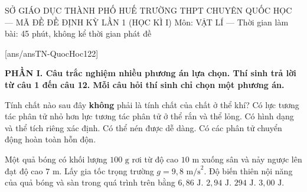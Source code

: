 

\def\toanlop{12}
\def\thoigian{45}
\def\namhoc{2024 - 2025}
\begin{dethi}
	{SỞ GIÁO DỤC THÀNH PHỐ HUẾ}
	{TRƯỜNG THPT CHUYÊN QUỐC HỌC --- MÃ ĐỀ \thedeso}
	{ĐỀ ĐỊNH KỲ LẦN 1 (HỌC KÌ I)}
	{Môn: VẬT LÍ --- Thời gian làm bài: 45 phút, không kể thời gian phát đề}
\end{dethi}

[ans/ansTN-QuocHoc122]

\noindent \textbf{PHẦN I. Câu trắc nghiệm nhiều phương án lựa chọn. Thí sinh trả lời từ câu 1 đến câu 12. Mỗi câu hỏi thí sinh chỉ chọn một phương án.}
\vspace{0.2cm}

\begin{ex}%
	Tính chất nào sau đây \textbf{không} phải là tính chất của chất ở thể khí?
	\choice
	{Có lực tương tác phân tử nhỏ hơn lực tương tác phân tử ở thể rắn và thể lỏng.}
	{\True Có hình dạng và thể tích riêng xác định.}
	{Có thể nén được dễ dàng.}
	{Có các phân tử chuyển động hoàn toàn hỗn độn.}
\end{ex}

\begin{ex}%
	Một quả bóng có khối lượng $100\text{ g}$ rơi từ độ cao $10\text{ m}$ xuống sân và nảy ngược lên đạt độ cao $7\text{ m}$. Lấy gia tốc trọng trường $g=9,8\text{ m/s}^2$. Độ biến thiên nội năng của quả bóng và sàn trong quá trình trên bằng
	\choice
	{$6,86\text{ J}$.}
	{\True $2,94\text{ J}$.}
	{$294\text{ J}$.}
	{$3,00\text{ J}$.}
\end{ex}

